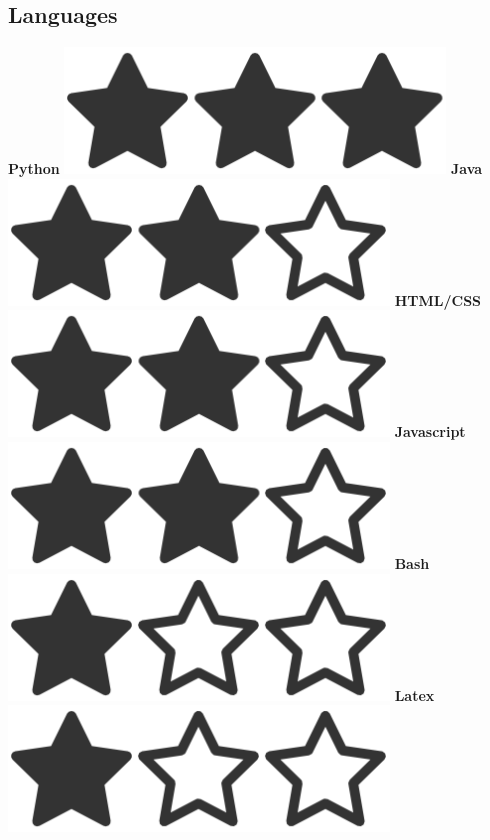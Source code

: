 \documentclass[]{friggeri-cv}
\begin{document}
\begin{aside}
  \section{Languages}
    \textbf{Python  }\includegraphics[scale=0.07]{img/3heart.png}
    \textbf{Java  }\includegraphics[scale=0.07]{img/2heart.png}
    \textbf{HTML/CSS  }\includegraphics[scale=0.07]{img/2heart.png}
    \textbf{Javascript  }\includegraphics[scale=0.07]{img/2heart.png}
    \textbf{Bash  }\includegraphics[scale=0.07]{img/1heart.png}  
    \textbf{Latex  }\includegraphics[scale=0.07]{img/1heart.png}
    ~

\end{aside}
\end{document}
